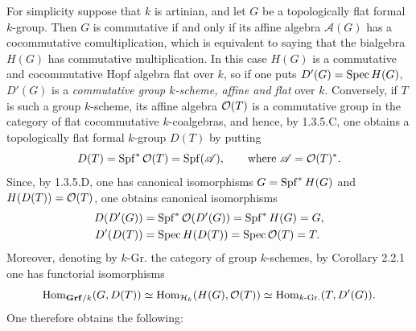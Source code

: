 For simplicity suppose that $k$ is artinian, and let $G$ be a topologically flat formal $k$-group. Then $G$ is commutative if and only if its affine algebra $\mathscr A(G)$ has a cocommutative comultiplication, which is equivalent to saying that the bialgebra $H(G)$ has commutative multiplication. In this case $H(G)$ is a commutative and cocommutative Hopf algebra flat over $k$, so if one puts $D'(G)=\operatorname{Spec} H(G)$, $D'(G)$ is a \emph{commutative group $k$-scheme, affine and flat} over $k$. Conversely, if $T$ is such a group $k$-scheme, its affine algebra $\mathcal{O}(T)$ is a commutative group in the category of flat cocommutative $k$-coalgebras, and hence, by 1.3.5.C, one obtains a topologically flat formal $k$-group $D(T)$ by putting
\[
D(T)=\operatorname{Spf}^*\mathcal{O}(T)=\operatorname{Spf}(\mathscr A),\qquad\text{where }\mathscr A=\mathcal{O}(T)^*.
\]
Since, by 1.3.5.D, one has canonical isomorphisms $G=\operatorname{Spf}^*H(G)$ and $H(D(T))=\mathcal{O}(T)$, one obtains canonical isomorphisms
\[
\begin{aligned}
D(D'(G))&=\operatorname{Spf}^*\mathcal{O}(D'(G))=\operatorname{Spf}^*H(G)=G,\\
D'(D(T))&=\operatorname{Spec} H(D(T))=\operatorname{Spec}\mathcal{O}(T)=T.
\end{aligned}
\]
Moreover, denoting by $k\text{-}\mathrm{Gr.}$ the category of group $k$-schemes, by Corollary 2.2.1 one has functorial isomorphisms
\[
\operatorname{Hom}_{\mathbf{Grf}/k}(G,D(T))\simeq\operatorname{Hom}_{\mathcal H_k}(H(G),\mathcal{O}(T))\simeq\operatorname{Hom}_{k\text{-}\mathrm{Gr.}}(T,D'(G)).
\]
One therefore obtains the following:
